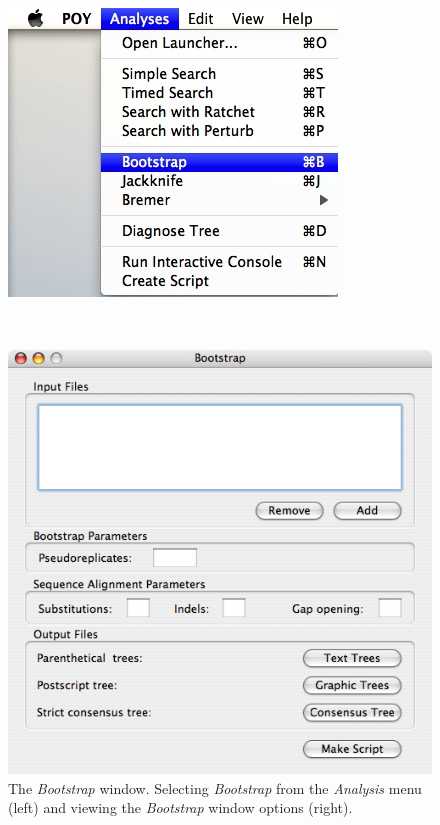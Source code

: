 {\begin{figure}
\centering
\begin{minipage}[c]{0.45\textwidth}
   		\includegraphics[width=\textwidth]{doc/figures/bootstrap_menu.jpg}
\end{minipage}
\,
\begin{minipage}[c]{0.52\textwidth}
	   	\includegraphics[width=\textwidth]{doc/figures/bootstrap_window.jpg}
   	\end{minipage}
\caption{The \emph{Bootstrap} window. Selecting \emph{Bootstrap} from the \emph{Analysis} menu (left) and viewing the \emph{Bootstrap} window options (right).}
\label{fig:bootstrap}
\end{figure}

}
